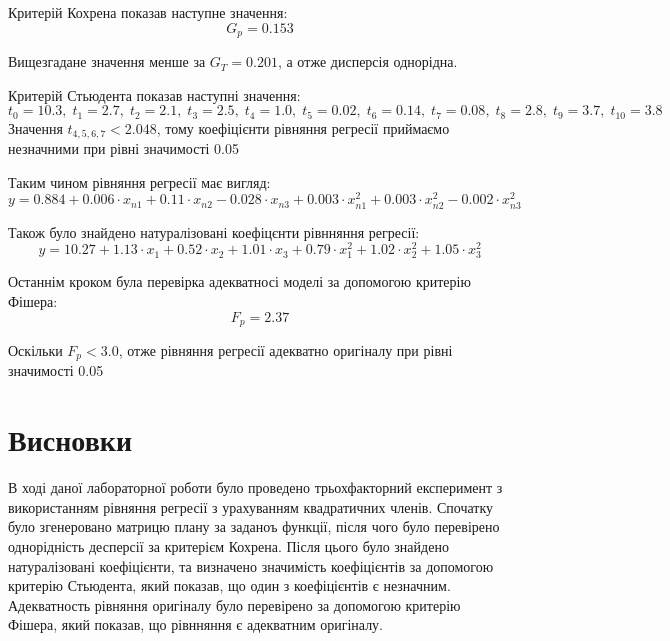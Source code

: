 Критерій Кохрена показав наступне значення:
\[G_p = 0.153\]

Вищезгадане значення менше за $G_T=0.201$, а отже дисперсія однорідна.

Критерій Стьюдента показав наступні значення:
\small
\[t_0=10.3,\; t_1=2.7,\; t_2=2.1,\; t_3=2.5,\; t_4=1.0,\; t_5=0.02,\; t_6=0.14,\; t_7=0.08,\; t_8=2.8,\; t_9=3.7,\; t_{10}=3.8\]
\normalsize
Значення $t_{4,5,6,7}<2.048$, тому коефіцієнти рівняння регресії приймаємо
незначними при рівні значимості 0.05

Таким чином рівняння регресії має вигляд:
\[y = 0.884+0.006\cdot x_{n1}+0.11\cdot x_{n2}-0.028\cdot x_{n3}+0.003\cdot x^2_{n1}+0.003\cdot x^2_{n2}-0.002\cdot x^2_{n3}\]

Також було знайдено натуралізовані коефіцєнти рівнняння регресії:
\[y = 10.27+1.13\cdot x_{1}+0.52\cdot x_{2}+1.01\cdot x_{3}+0.79\cdot x^2_{1}+1.02\cdot x^2_{2}+1.05\cdot x^2_{3}\]

Останнім кроком була перевірка адекватносі моделі за допомогою критерію Фішера:
\[F_p = 2.37\]

Оскільки $F_p<3.0$, отже рівняння регресії адекватно оригіналу при рівні 
значимості 0.05

\section{Висновки}
В ході даної лабораторної роботи було проведено трьохфакторний експеримент з 
використанням рівняння регресії з урахуванням квадратичних членів. Спочатку 
було згенеровано матрицю плану за заданоъ функції, після чого було перевірено 
однорідність десперсії за критерієм Кохрена. Після цього було знайдено натуралізовані
коефіцієнти, та визначено значимість коефіцієнтів за допомогою критерію Стьюдента, 
який показав, що один з коефіцієнтів є незначним. Адекватность рівняння оригіналу 
було перевірено за допомогою критерію Фішера, який показав, що рівнняння є 
адекватним оригіналу.
